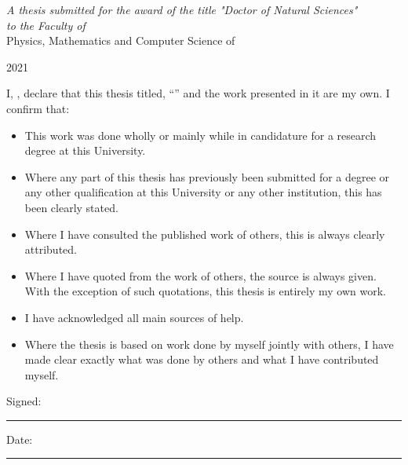 \documentclass[
11pt, %
ngerman,
english, %
singlespacing, %
headsepline, %
]{MastersDoctoralThesis} %
\begin{document}
\begin{titlepage}
\begin{center}
\vfill

	\large \textit{A thesis submitted for the award of the title "Doctor of Natural Sciences"} \\[0.3cm] %
\textit{to the Faculty of}\\[0.4cm]
	Physics, Mathematics and Computer Science of \\
	{\univname\par} %
 
\vfill

{\large 2021}\\[4cm] %
 
\vfill
\end{center}
\end{titlepage}


\begin{declaration}
\addchaptertocentry{\authorshipname} %
\noindent I, \authorname, declare that this thesis titled, \enquote{\ttitle} and the work presented in it are my own. I confirm that:

\begin{itemize} 
\item This work was done wholly or mainly while in candidature for a research degree at this University.
\item Where any part of this thesis has previously been submitted for a degree or any other qualification at this University or any other institution, this has been clearly stated.
\item Where I have consulted the published work of others, this is always clearly attributed.
\item Where I have quoted from the work of others, the source is always given. With the exception of such quotations, this thesis is entirely my own work.
\item I have acknowledged all main sources of help.
\item Where the thesis is based on work done by myself jointly with others, I have made clear exactly what was done by others and what I have contributed myself.\\
\end{itemize}
 
\noindent Signed:\\
\rule[0.5em]{25em}{0.5pt} %
 
\noindent Date:\\
\rule[0.5em]{25em}{0.5pt} %
\end{declaration}
\end{document}
